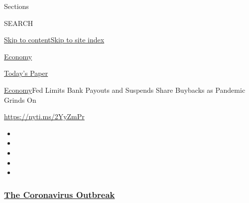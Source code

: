 Sections

SEARCH

\protect\hyperlink{site-content}{Skip to
content}\protect\hyperlink{site-index}{Skip to site index}

\href{https://www.nytimes3xbfgragh.onion/section/business/economy}{Economy}

\href{https://myaccount.nytimes3xbfgragh.onion/auth/login?response_type=cookie\&client_id=vi}{}

\href{https://www.nytimes3xbfgragh.onion/section/todayspaper}{Today's
Paper}

\href{/section/business/economy}{Economy}\textbar{}Fed Limits Bank
Payouts and Suspends Share Buybacks as Pandemic Grinds On

\url{https://nyti.ms/2YyZmPr}

\begin{itemize}
\item
\item
\item
\item
\item
\end{itemize}

\hypertarget{the-coronavirus-outbreak}{%
\subsubsection{\texorpdfstring{\href{https://www.nytimes3xbfgragh.onion/news-event/coronavirus?name=styln-coronavirus-markets\&region=TOP_BANNER\&variant=undefined\&block=storyline_menu_recirc\&action=click\&pgtype=Article\&impression_id=fd8f52a0-e387-11ea-bb43-632ae03b21d4}{The
Coronavirus
Outbreak}}{The Coronavirus Outbreak}}\label{the-coronavirus-outbreak}}

